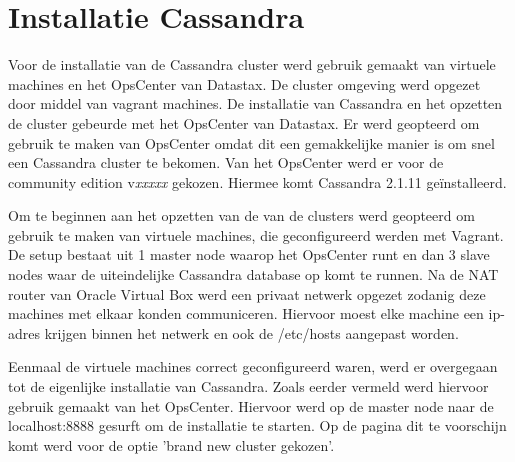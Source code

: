 \chapter{Installatie Cassandra}
\label{ch:installatie_cassandra}

Voor de installatie van de Cassandra cluster werd gebruik gemaakt van virtuele machines en het OpsCenter van Datastax.
De cluster omgeving werd opgezet door middel van vagrant machines.
De installatie van Cassandra en het opzetten de cluster gebeurde met het OpsCenter van Datastax.
Er werd geopteerd om gebruik te maken van OpsCenter omdat dit een gemakkelijke manier is om snel een Cassandra cluster te bekomen.
Van het OpsCenter werd er voor de community edition v\textit{xxxxx} gekozen.
Hiermee komt Cassandra 2.1.11 geïnstalleerd.

Om te beginnen aan het opzetten van de van de clusters werd geopteerd om gebruik te maken van virtuele machines, die geconfigureerd werden met Vagrant.
De setup bestaat uit 1 master node waarop het OpsCenter runt en dan 3 slave nodes waar de uiteindelijke Cassandra database op komt te runnen.
Na de NAT router van Oracle Virtual Box werd een privaat netwerk opgezet zodanig deze machines met elkaar konden communiceren.
Hiervoor moest elke machine een ip-adres krijgen binnen het netwerk en ook de /etc/hosts aangepast worden.

Eenmaal de virtuele machines correct geconfigureerd waren, werd er overgegaan tot de eigenlijke installatie van Cassandra.
Zoals eerder vermeld werd hiervoor gebruik gemaakt van het OpsCenter.
Hiervoor werd op de master node naar de localhost:8888 gesurft om de installatie te starten. Op de pagina dit te voorschijn komt werd voor de optie 'brand new cluster gekozen'.